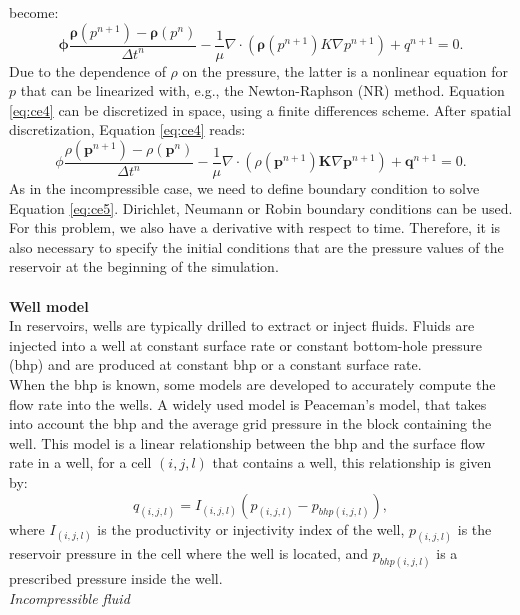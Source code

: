 \documentclass[review]{elsarticle}
\begin{document}
become:
\begin{equation}\label{eq:ce4}
 \mathbf{\phi}\frac{\mathbf{\rho}({p}^{n+1})
 -\mathbf{\rho}({p}^{n})}{\Delta t^n}
 -\frac{1}{\mu}\nabla \cdot (\mathbf{\rho}({p}^{n+1}) 
 {K}\nabla{p}^{n+1})+{q}^{n+1}=0.
\end{equation}
Due to the dependence of $\rho$ on the pressure, the latter is a nonlinear equation for $p$ that can be linearized with, e.g., the Newton-Raphson (NR) method.
Equation \eqref{eq:ce4} can be discretized in space, using a finite differences scheme. After spatial discretization, Equation \eqref{eq:ce4} reads:
\begin{equation}\label{eq:ce5}
 {\phi}\frac{{\rho}(\mathbf{p}^{n+1})
 -{\rho}(\mathbf{p}^{n})}{\Delta t^n}
 -\frac{1}{\mu}\nabla \cdot ({\rho}(\mathbf{p}^{n+1}) 
 \mathbf{K}\nabla\mathbf{p}^{n+1})+\mathbf{q}^{n+1}=0.
\end{equation}
As in the incompressible case, we need to define boundary condition to solve Equation \eqref{eq:ce5}. Dirichlet, Neumann or Robin boundary conditions can be used. For this problem, we also have a derivative with respect to time. Therefore, it is also necessary to specify the initial conditions that are the pressure values of the reservoir at the beginning of the simulation.\\\\
\textbf{Well model}\\
In reservoirs, wells are typically drilled to extract or inject fluids. Fluids are injected into a well at constant 
surface rate or constant bottom-hole pressure (bhp) and are produced at constant bhp or a constant surface rate.\\
 When the bhp is known, some models are developed to accurately compute the flow rate into the wells. 
 A widely used model is Peaceman's model, that takes into account the bhp and the average grid pressure in the block containing the well. 
This model is a linear relationship between the bhp and the surface flow rate in a well, for a cell $(i,j,l)$ that contains a well, this relationship is given by:
\begin{equation}\label{eq:wellm}
{q}_{(i,j,l)}={I}_{(i,j,l)}({p}_{(i,j,l)}-{p}_{bhp(i,j,l)}),
\end{equation}
where ${I}_{(i,j,l)}$ is the productivity or injectivity index of the well, ${p}_{(i,j,l)}$ is the reservoir pressure in the cell 
where the well is located, 
and ${p}_{bhp(i,j,l)}$ is a prescribed pressure inside the well. \\
\emph{Incompressible fluid}\\
\end{document}
